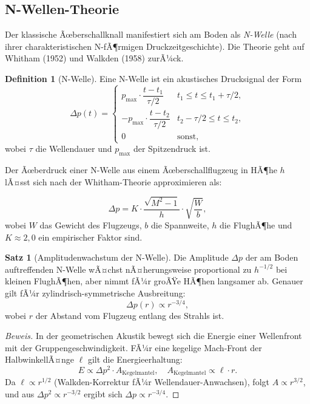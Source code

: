 ﻿\documentclass[12pt,a4paper]{article}
\theoremstyle{definition}
\newtheorem{definition}{Definition}[section]
\newtheorem{satz}{Satz}[section]
\theoremstyle{remark}
\newenvironment{beweis}{\begin{proof}[Beweis]}{\end{proof}}
\begin{document}
\subsection{N-Wellen-Theorie}

Der klassische Ãœberschallknall manifestiert sich am Boden als \emph{N-Welle} (nach ihrer
charakteristischen N-fÃ¶rmigen Druckzeitgeschichte). Die Theorie geht auf Whitham (1952)
und Walkden (1958) zurÃ¼ck.

\begin{definition}[N-Welle]
  Eine N-Welle ist ein akustisches Drucksignal der Form
  \begin{equation}
    \Delta p(t) =
    \begin{cases}
      p_{\max} \cdot \dfrac{t - t_1}{\tau/2} & t_1 \le t \le t_1 + \tau/2, \\[6pt]
      -p_{\max} \cdot \dfrac{t - t_2}{\tau/2} & t_2 - \tau/2 \le t \le t_2, \\[6pt]
      0 & \text{sonst},
    \end{cases}
    \label{eq:n_welle}
  \end{equation}
  wobei $\tau$ die Wellendauer und $p_{\max}$ der Spitzendruck ist.
\end{definition}

Der Ãœberdruck einer N-Welle aus einem Ãœberschallflugzeug in HÃ¶he $h$ lÃ¤sst sich nach
der Whitham-Theorie approximieren als:

\begin{equation}
  \Delta p = K \cdot \frac{\sqrt{M^2 - 1}}{h} \cdot \sqrt{\frac{W}{b}},
  \label{eq:whitham_druck}
\end{equation}
wobei $W$ das Gewicht des Flugzeugs, $b$ die Spannweite, $h$ die FlughÃ¶he und $K \approx 2{,}0$
ein empirischer Faktor sind.

\begin{satz}[Amplitudenwachstum der N-Welle]
  \label{satz:amplitude}
  Die Amplitude $\Delta p$ der am Boden auftreffenden N-Welle wÃ¤chst nÃ¤herungsweise
  proportional zu $h^{-1/2}$ bei kleinen FlughÃ¶hen, aber nimmt fÃ¼r groÃŸe HÃ¶hen langsamer ab.
  Genauer gilt fÃ¼r zylindrisch-symmetrische Ausbreitung:
  \begin{equation}
    \Delta p(r) \propto r^{-3/4},
  \end{equation}
  wobei $r$ der Abstand vom Flugzeug entlang des Strahls ist.
\end{satz}

\begin{beweis}
  In der geometrischen Akustik bewegt sich die Energie einer Wellenfront mit der Gruppengeschwindigkeit.
  FÃ¼r eine kegelige Mach-Front der HalbwinkellÃ¤nge $\ell$ gilt die Energieerhaltung:
  \begin{equation}
    E \propto \Delta p^2 \cdot A_\text{Kegelmantel}, \quad A_\text{Kegelmantel} \propto \ell \cdot r.
  \end{equation}
  Da $\ell \propto r^{1/2}$ (Walkden-Korrektur fÃ¼r Wellendauer-Anwachsen), folgt
  $A \propto r^{3/2}$, und aus $\Delta p^2 \propto r^{-3/2}$ ergibt sich
  $\Delta p \propto r^{-3/4}$.
\end{beweis}
\end{document}
